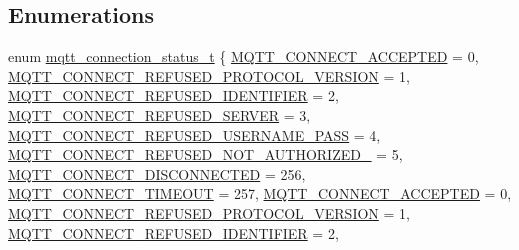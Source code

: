 \subsection*{Enumerations}
\begin{DoxyCompactItemize}
\item 
enum \hyperlink{group__mqtt_ga8cf0f360ab20343af37e1d124395a77d}{mqtt\+\_\+connection\+\_\+status\+\_\+t} \{ \newline
\hyperlink{group__mqtt_gga8cf0f360ab20343af37e1d124395a77da074dc1d289b8e8d4aad91f6a2cb93dc1}{M\+Q\+T\+T\+\_\+\+C\+O\+N\+N\+E\+C\+T\+\_\+\+A\+C\+C\+E\+P\+T\+ED} = 0, 
\hyperlink{group__mqtt_gga8cf0f360ab20343af37e1d124395a77da41f8aa97142be337cb639f94d9145190}{M\+Q\+T\+T\+\_\+\+C\+O\+N\+N\+E\+C\+T\+\_\+\+R\+E\+F\+U\+S\+E\+D\+\_\+\+P\+R\+O\+T\+O\+C\+O\+L\+\_\+\+V\+E\+R\+S\+I\+ON} = 1, 
\hyperlink{group__mqtt_gga8cf0f360ab20343af37e1d124395a77da28ffe49b0175adaa2b9a27cb4873224a}{M\+Q\+T\+T\+\_\+\+C\+O\+N\+N\+E\+C\+T\+\_\+\+R\+E\+F\+U\+S\+E\+D\+\_\+\+I\+D\+E\+N\+T\+I\+F\+I\+ER} = 2, 
\hyperlink{group__mqtt_gga8cf0f360ab20343af37e1d124395a77dade28ec1c2ce3d874e91251d683c92b2a}{M\+Q\+T\+T\+\_\+\+C\+O\+N\+N\+E\+C\+T\+\_\+\+R\+E\+F\+U\+S\+E\+D\+\_\+\+S\+E\+R\+V\+ER} = 3, 
\newline
\hyperlink{group__mqtt_gga8cf0f360ab20343af37e1d124395a77da290cf9037054c42022cc864cfade896a}{M\+Q\+T\+T\+\_\+\+C\+O\+N\+N\+E\+C\+T\+\_\+\+R\+E\+F\+U\+S\+E\+D\+\_\+\+U\+S\+E\+R\+N\+A\+M\+E\+\_\+\+P\+A\+SS} = 4, 
\hyperlink{group__mqtt_gga8cf0f360ab20343af37e1d124395a77dafc4888158dd6ee84269a5f0bfdc12b17}{M\+Q\+T\+T\+\_\+\+C\+O\+N\+N\+E\+C\+T\+\_\+\+R\+E\+F\+U\+S\+E\+D\+\_\+\+N\+O\+T\+\_\+\+A\+U\+T\+H\+O\+R\+I\+Z\+E\+D\+\_\+} = 5, 
\hyperlink{group__mqtt_gga8cf0f360ab20343af37e1d124395a77da321f5ce31b173f235de1a517fcfd00dd}{M\+Q\+T\+T\+\_\+\+C\+O\+N\+N\+E\+C\+T\+\_\+\+D\+I\+S\+C\+O\+N\+N\+E\+C\+T\+ED} = 256, 
\hyperlink{group__mqtt_gga8cf0f360ab20343af37e1d124395a77da57153f2ab4331c6f76a9ee74e1bcfc62}{M\+Q\+T\+T\+\_\+\+C\+O\+N\+N\+E\+C\+T\+\_\+\+T\+I\+M\+E\+O\+UT} = 257, 
\newline
\hyperlink{group__mqtt_gga8cf0f360ab20343af37e1d124395a77da074dc1d289b8e8d4aad91f6a2cb93dc1}{M\+Q\+T\+T\+\_\+\+C\+O\+N\+N\+E\+C\+T\+\_\+\+A\+C\+C\+E\+P\+T\+ED} = 0, 
\hyperlink{group__mqtt_gga8cf0f360ab20343af37e1d124395a77da41f8aa97142be337cb639f94d9145190}{M\+Q\+T\+T\+\_\+\+C\+O\+N\+N\+E\+C\+T\+\_\+\+R\+E\+F\+U\+S\+E\+D\+\_\+\+P\+R\+O\+T\+O\+C\+O\+L\+\_\+\+V\+E\+R\+S\+I\+ON} = 1, 
\hyperlink{group__mqtt_gga8cf0f360ab20343af37e1d124395a77da28ffe49b0175adaa2b9a27cb4873224a}{M\+Q\+T\+T\+\_\+\+C\+O\+N\+N\+E\+C\+T\+\_\+\+R\+E\+F\+U\+S\+E\+D\+\_\+\+I\+D\+E\+N\+T\+I\+F\+I\+ER} = 2, 

\end{DoxyCompactItemize}
